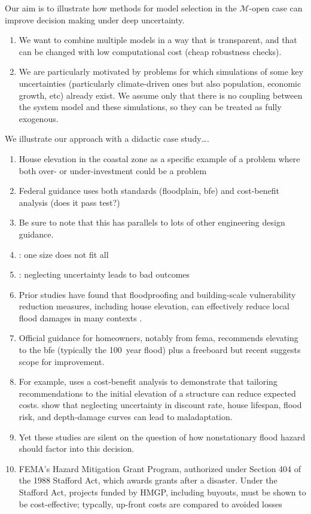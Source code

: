 \documentclass[11pt]{article}
\begin{document}
Our aim is to illustrate how methods for model selection in the $\mathcal{M}$-open case can improve decision making under deep uncertainty.
\begin{enumerate}
    \item We want to combine multiple models in a way that is transparent, and that can be changed with low computational cost (cheap robustness checks).
    \item We are particularly motivated by problems for which simulations of some key uncertainties (particularly climate-driven ones but also population, economic growth, etc) already exist. We assume only that there is no coupling between the system model and these simulations, so they can be treated as fully exogenous.
\end{enumerate}
We illustrate our approach with a didactic case study\ldots.
\begin{enumerate}
    \item House elevation in the coastal zone as a specific example of a problem where both over- or under-investment could be a problem
    \item Federal guidance uses both standards (floodplain, \gls{bfe}) and cost-benefit analysis (does it pass test?)
    \item Be sure to note that this has parallels to lots of other engineering design guidance.
    \item \citet{xian_elevation:2017}: one size does not fit all
    \item \citet{zarekarizi_suboptimal:2020}: neglecting uncertainty leads to bad outcomes
    \item Prior studies have found that floodproofing and building-scale vulnerability reduction measures, including house elevation, can effectively reduce local flood damages in many contexts \citep{demoel_reducing:2014,deruig_building:2020,kreibich_building:2005,slotter_floodproofing:2020,Rozer:2016dn,mobley_mitigation:2020,aerts_cost:2018}.
    \item Official guidance for homeowners, notably from \gls{fema}, recommends elevating to the \gls{bfe} (typically the \SI{100}{year} flood) plus a freeboard \citep{fema_retrofitting:2014,asce_24-14:2015,fema_retrofitting:2014} but recent suggests scope for improvement.
    \item For example, \citet{xian_elevation:2017} uses a cost-benefit analysis to demonstrate that tailoring recommendations to the initial elevation of a structure can reduce expected costs.
          \citet{zarekarizi_suboptimal:2020} show that neglecting uncertainty in discount rate, house lifespan, flood risk, and depth-damage curves can lead to maladaptation.
    \item Yet these studies are silent on the question of how nonstationary flood hazard should factor into this decision.
    \item FEMA's Hazard Mitigation Grant Program, authorized under Section 404 of the 1988 Stafford Act, which awards grants after a disaster. Under the Stafford Act, projects funded by HMGP, including buyouts, must be shown to be cost-effective; typcally, up-front costs are compared to avoided losses \citep{bendor_buyouts:2020}
\end{enumerate}
\end{document}
